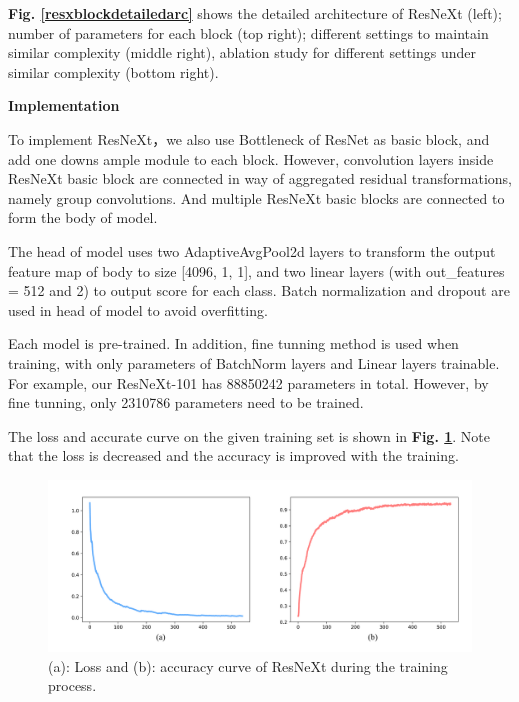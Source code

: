\documentclass[a4paper]{article}
\begin{document}
{\textbf{Fig. \ref{resxblockdetailedarc}} shows the detailed architecture of \textsf{ResNeXt} (left); number of parameters for each block (top right); different settings to maintain similar complexity (middle right), ablation study for different settings under similar complexity (bottom right).

}

\vspace{2mm}
\begin{center}
\large\textbf{Implementation} \\
\end{center}

\large{

To implement \textsf{ResNeXt}，we also use Bottleneck of \textsf{ResNet} as basic block, and add one downs ample module to each block. However, convolution layers inside \textsf{ResNeXt} basic block are connected in way of aggregated residual transformations, namely group convolutions. And multiple \textsf{ResNeXt} basic blocks are connected to form the body of model.

The head of model uses two AdaptiveAvgPool2d layers to transform the output feature map of body to size [4096, 1, 1], and two linear layers (with out\_features = 512 and 2) to output score for each class. Batch normalization and dropout are used in head of model to avoid overfitting.

Each model is pre-trained. In addition, fine tunning method is used when training, with only parameters of BatchNorm layers and Linear layers trainable. For example, our \textsf{ResNeXt-101} has 88850242 parameters in total. However, by fine tunning, only 2310786 parameters need to be trained.

The loss and accurate curve on the given training set is shown in \textbf{Fig. \ref{resxacc}}. Note that the loss is decreased and the accuracy is improved with the training.

\begin{figure}[h]
\centering
\includegraphics[width=15cm]{resx_acc.pdf}
\caption{(a): Loss and (b): accuracy curve of \textsf{ResNeXt} during the training process.}
\label{resxacc}
\end{figure}

}
\end{document}
